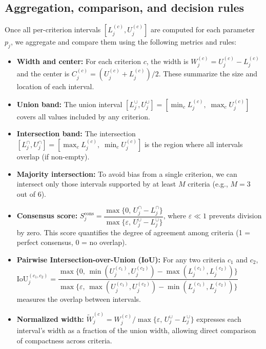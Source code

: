 \documentclass[12pt,a4paper]{article}
\begin{document}
\subsection{Aggregation, comparison, and decision rules}
Once all per-criterion intervals $[L^{(c)}_j, U^{(c)}_j]$ are computed for each parameter $p_j$, we aggregate and compare them using the following metrics and rules:
\begin{itemize}
    \item \textbf{Width and center:} For each criterion $c$, the width is $W^{(c)}_j=U^{(c)}_j-L^{(c)}_j$ and the center is $C^{(c)}_j=(U^{(c)}_j+L^{(c)}_j)/2$. These summarize the size and location of each interval.
    \item \textbf{Union band:} The union interval $[L^{\cup}_j, U^{\cup}_j]=[\min_c L^{(c)}_j,\; \max_c U^{(c)}_j]$ covers all values included by any criterion.
    \item \textbf{Intersection band:} The intersection $[L^{\cap}_j, U^{\cap}_j]=[\max_c L^{(c)}_j,\; \min_c U^{(c)}_j]$ is the region where all intervals overlap (if non-empty).
    \item \textbf{Majority intersection:} To avoid bias from a single criterion, we can intersect only those intervals supported by at least $M$ criteria (e.g., $M=3$ out of 6).
    \item \textbf{Consensus score:} $S^{\text{cons}}_j = \dfrac{\max\{0,\,U^{\cap}_j-L^{\cap}_j\}}{\max\{\varepsilon,\,U^{\cup}_j-L^{\cup}_j\}}$, where $\varepsilon\ll1$ prevents division by zero. This score quantifies the degree of agreement among criteria (1 = perfect consensus, 0 = no overlap).
    \item \textbf{Pairwise Intersection-over-Union (IoU):} For any two criteria $c_1$ and $c_2$, $\mathrm{IoU}^{(c_1,c_2)}_j = \dfrac{\max\{0,\,\min(U^{(c_1)}_j,U^{(c_2)}_j)-\max(L^{(c_1)}_j,L^{(c_2)}_j)\}}{\max\{\varepsilon,\,\max(U^{(c_1)}_j,U^{(c_2)}_j)-\min(L^{(c_1)}_j,L^{(c_2)}_j)\}}$ measures the overlap between intervals.
    \item \textbf{Normalized width:} $\tilde W^{(c)}_j = W^{(c)}_j/\max\{\varepsilon,\,U^{\cup}_j-L^{\cup}_j\}$ expresses each interval’s width as a fraction of the union width, allowing direct comparison of compactness across criteria.
\end{itemize}
\end{document}
